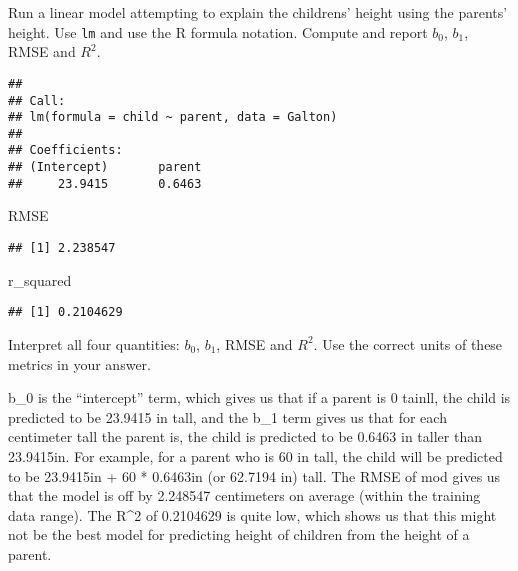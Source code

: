\documentclass[
]{article}
\newenvironment{Shaded}{\begin{snugshade}}{\end{snugshade}}
\newcommand{\DecValTok}[1]{\textcolor[rgb]{0.00,0.00,0.81}{#1}}
\newcommand{\FunctionTok}[1]{\textcolor[rgb]{0.00,0.00,0.00}{#1}}
\newcommand{\NormalTok}[1]{#1}
\newcommand{\OtherTok}[1]{\textcolor[rgb]{0.56,0.35,0.01}{#1}}
\newcommand{\SpecialCharTok}[1]{\textcolor[rgb]{0.00,0.00,0.00}{#1}}
\begin{document}
Run a linear model attempting to explain the childrens' height using the
parents' height. Use \texttt{lm} and use the R formula notation. Compute
and report \(b_0\), \(b_1\), RMSE and \(R^2\).

\begin{Shaded}
\end{Shaded}

\begin{verbatim}
## 
## Call:
## lm(formula = child ~ parent, data = Galton)
## 
## Coefficients:
## (Intercept)       parent  
##     23.9415       0.6463
\end{verbatim}

\begin{Shaded}
\begin{Highlighting}[]
\NormalTok{RMSE}
\end{Highlighting}
\end{Shaded}

\begin{verbatim}
## [1] 2.238547
\end{verbatim}

\begin{Shaded}
\begin{Highlighting}[]
\NormalTok{r\_squared}
\end{Highlighting}
\end{Shaded}

\begin{verbatim}
## [1] 0.2104629
\end{verbatim}

Interpret all four quantities: \(b_0\), \(b_1\), RMSE and \(R^2\). Use
the correct units of these metrics in your answer.

b\_0 is the ``intercept'' term, which gives us that if a parent is 0
tainll, the child is predicted to be 23.9415 in tall, and the b\_1 term
gives us that for each centimeter tall the parent is, the child is
predicted to be 0.6463 in taller than 23.9415in. For example, for a
parent who is 60 in tall, the child will be predicted to be 23.9415in +
60 * 0.6463in (or 62.7194 in) tall. The RMSE of mod gives us that the
model is off by 2.248547 centimeters on average (within the training
data range). The R\^{}2 of 0.2104629 is quite low, which shows us that
this might not be the best model for predicting height of children from
the height of a parent.
\end{document}
